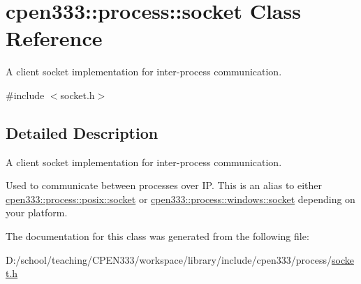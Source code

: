 \hypertarget{classcpen333_1_1process_1_1socket}{}\section{cpen333\+:\+:process\+:\+:socket Class Reference}
\label{classcpen333_1_1process_1_1socket}


A client socket implementation for inter-\/process communication.  




{\ttfamily \#include $<$socket.\+h$>$}



\subsection{Detailed Description}
A client socket implementation for inter-\/process communication. 

Used to communicate between processes over IP. This is an alias to either \hyperlink{classcpen333_1_1process_1_1posix_1_1socket}{cpen333\+::process\+::posix\+::socket} or \hyperlink{classcpen333_1_1process_1_1windows_1_1socket}{cpen333\+::process\+::windows\+::socket} depending on your platform. 

The documentation for this class was generated from the following file\+:\begin{DoxyCompactItemize}
\item 
D\+:/school/teaching/\+C\+P\+E\+N333/workspace/library/include/cpen333/process/\hyperlink{socket_8h}{socket.\+h}\end{DoxyCompactItemize}
